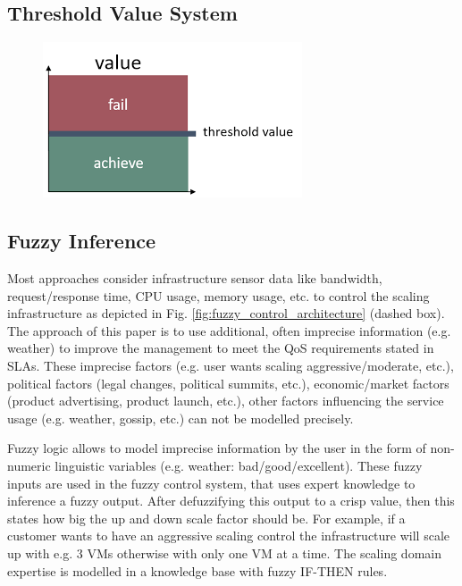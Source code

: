 \subsection{Threshold Value System}

\begin{figure}[ht]
	\centering
	\includegraphics[width=0.7\linewidth]{chapters/chapter5/fig/threshold}
	\caption{}
	\label{fig:threshold}
\end{figure}

\subsection*{Fuzzy Inference }
Most approaches consider infrastructure sensor data like bandwidth, request/response time, CPU usage, memory usage, etc. to control the scaling infrastructure as depicted in Fig. \ref{fig:fuzzy_control_architecture} (dashed box). The approach of this paper is to use additional, often imprecise information (e.g. weather) to improve the management to meet the QoS requirements stated in SLAs. These imprecise factors (e.g. user wants scaling aggressive/moderate, etc.), political factors (legal changes, political summits, etc.), economic/market factors (product advertising, product launch, etc.), other factors influencing the service usage (e.g. weather, gossip, etc.) can not be modelled precisely.

Fuzzy logic allows to model imprecise information by the user in the form of non-numeric linguistic variables (e.g. weather: bad/good/excellent). These fuzzy inputs are used in the fuzzy control system, that uses expert knowledge to inference a fuzzy output. After defuzzifying this output to a crisp value, then this states how big the up and down scale factor should be. For example, if a customer wants to have an aggressive scaling control the infrastructure will scale up with e.g. 3 VMs otherwise with only one VM at a time. The scaling domain expertise is modelled in a knowledge base with fuzzy IF-THEN rules.

